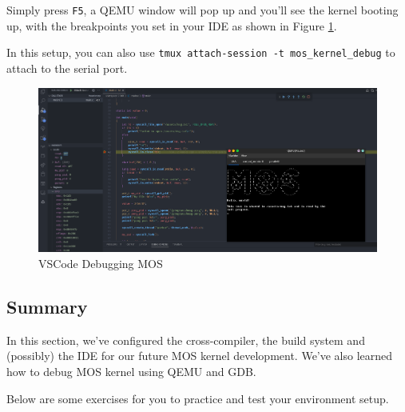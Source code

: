 Simply press \texttt{F5}, a QEMU window will pop up and you'll see the kernel booting up, with
the breakpoints you set in your IDE as shown in Figure \ref{fig:vscode-debugging}.

In this setup, you can also use \texttt{tmux attach-session -t mos\_kernel\_debug} to attach to the serial
port.

\begin{figure}[ht]
    \centering
    \includegraphics[width=\textwidth]{assets/c1.vscode-debugging.png}
    \caption{VSCode Debugging MOS}
    \label{fig:vscode-debugging}
\end{figure}

\subsection{Summary}

In this section, we've configured the cross-compiler, the build system and (possibly) the IDE for
our future MOS kernel development. We've also learned how to debug MOS kernel using QEMU and GDB.

Below are some exercises for you to practice and test your environment setup.

